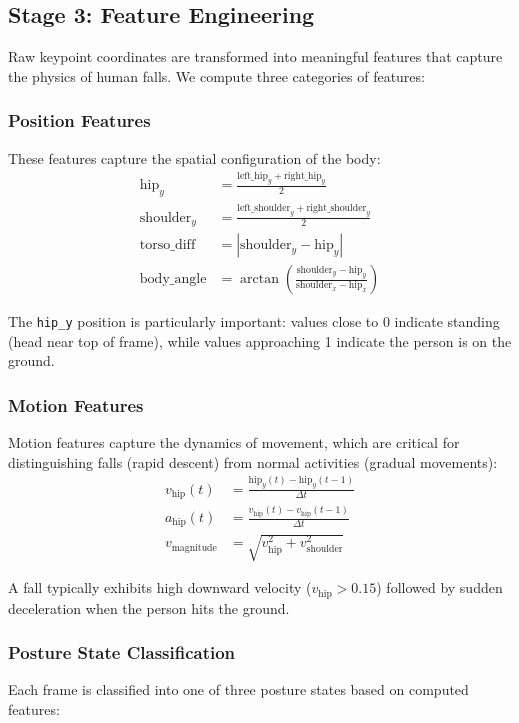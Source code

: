 \documentclass[conference]{IEEEtran}
\begin{document}
\subsection{Stage 3: Feature Engineering}

Raw keypoint coordinates are transformed into meaningful features that capture the physics of human falls. We compute three categories of features:

\subsubsection{Position Features}
These features capture the spatial configuration of the body:
\begin{align}
\text{hip}_y &= \frac{\text{left\_hip}_y + \text{right\_hip}_y}{2} \\
\text{shoulder}_y &= \frac{\text{left\_shoulder}_y + \text{right\_shoulder}_y}{2} \\
\text{torso\_diff} &= |\text{shoulder}_y - \text{hip}_y| \\
\text{body\_angle} &= \arctan\left(\frac{\text{shoulder}_y - \text{hip}_y}{\text{shoulder}_x - \text{hip}_x}\right)
\end{align}

The \texttt{hip\_y} position is particularly important: values close to 0 indicate standing (head near top of frame), while values approaching 1 indicate the person is on the ground.

\subsubsection{Motion Features}
Motion features capture the dynamics of movement, which are critical for distinguishing falls (rapid descent) from normal activities (gradual movements):
\begin{align}
v_{\text{hip}}(t) &= \frac{\text{hip}_y(t) - \text{hip}_y(t-1)}{\Delta t} \\
a_{\text{hip}}(t) &= \frac{v_{\text{hip}}(t) - v_{\text{hip}}(t-1)}{\Delta t} \\
v_{\text{magnitude}} &= \sqrt{v_{\text{hip}}^2 + v_{\text{shoulder}}^2}
\end{align}

A fall typically exhibits high downward velocity ($v_{\text{hip}} > 0.15$) followed by sudden deceleration when the person hits the ground.

\subsubsection{Posture State Classification}
Each frame is classified into one of three posture states based on computed features:
\end{document}
